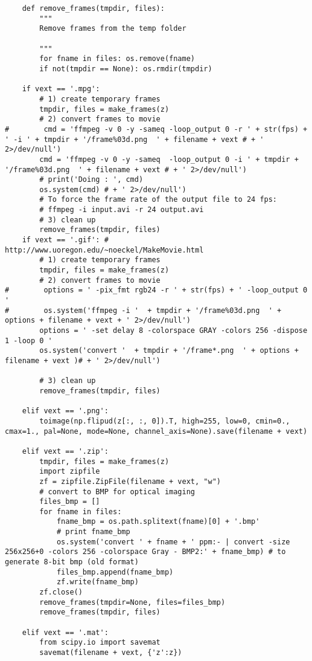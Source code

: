 \documentclass[a4paper,11pt]{article}%
\begin{document}
\begin{lstlisting}
    def remove_frames(tmpdir, files):
        """
        Remove frames from the temp folder
        
        """
        for fname in files: os.remove(fname)
        if not(tmpdir == None): os.rmdir(tmpdir)

    if vext == '.mpg':
        # 1) create temporary frames
        tmpdir, files = make_frames(z)
        # 2) convert frames to movie
#        cmd = 'ffmpeg -v 0 -y -sameq -loop_output 0 -r ' + str(fps) + ' -i ' + tmpdir + '/frame%03d.png  ' + filename + vext # + ' 2>/dev/null')
        cmd = 'ffmpeg -v 0 -y -sameq  -loop_output 0 -i ' + tmpdir + '/frame%03d.png  ' + filename + vext # + ' 2>/dev/null')
        # print('Doing : ', cmd)
        os.system(cmd) # + ' 2>/dev/null')
        # To force the frame rate of the output file to 24 fps:
        # ffmpeg -i input.avi -r 24 output.avi
        # 3) clean up
        remove_frames(tmpdir, files)
    if vext == '.gif': # http://www.uoregon.edu/~noeckel/MakeMovie.html
        # 1) create temporary frames
        tmpdir, files = make_frames(z)
        # 2) convert frames to movie
#        options = ' -pix_fmt rgb24 -r ' + str(fps) + ' -loop_output 0 '
#        os.system('ffmpeg -i '  + tmpdir + '/frame%03d.png  ' + options + filename + vext + ' 2>/dev/null')
        options = ' -set delay 8 -colorspace GRAY -colors 256 -dispose 1 -loop 0 '
        os.system('convert '  + tmpdir + '/frame*.png  ' + options + filename + vext )# + ' 2>/dev/null')

        # 3) clean up
        remove_frames(tmpdir, files)

    elif vext == '.png':
        toimage(np.flipud(z[:, :, 0]).T, high=255, low=0, cmin=0., cmax=1., pal=None, mode=None, channel_axis=None).save(filename + vext)

    elif vext == '.zip':
        tmpdir, files = make_frames(z)
        import zipfile
        zf = zipfile.ZipFile(filename + vext, "w")
        # convert to BMP for optical imaging
        files_bmp = []
        for fname in files:
            fname_bmp = os.path.splitext(fname)[0] + '.bmp'
            # print fname_bmp
            os.system('convert ' + fname + ' ppm:- | convert -size 256x256+0 -colors 256 -colorspace Gray - BMP2:' + fname_bmp) # to generate 8-bit bmp (old format)
            files_bmp.append(fname_bmp)
            zf.write(fname_bmp)
        zf.close()
        remove_frames(tmpdir=None, files=files_bmp)
        remove_frames(tmpdir, files)

    elif vext == '.mat':
        from scipy.io import savemat
        savemat(filename + vext, {'z':z})


\end{lstlisting}
\end{document}
